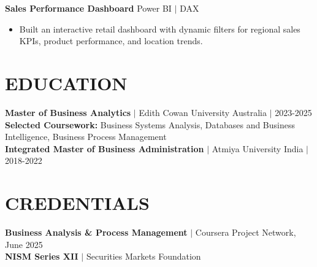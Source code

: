 \documentclass[letterpaper,10pt]{article}
\newcommand{\project}[2]{\textbf{#1} \hfill #2\par\vspace{-1pt}}
\begin{document}
\project{Sales Performance Dashboard}{Power BI $\vert$ DAX}
\begin{itemize}
  \item Built an interactive retail dashboard with dynamic filters for regional sales KPIs, product performance, and location trends.
\end{itemize}

\section*{EDUCATION}
\textbf{Master of Business Analytics} $\vert$ Edith Cowan University \hfill Australia $\vert$ 2023-2025\\
\textbf{Selected Coursework:} Business Systems Analysis, Databases and Business Intelligence, Business Process Management\\
\textbf{Integrated Master of Business Administration} $\vert$ Atmiya University \hfill India $\vert$ 2018-2022

\section*{CREDENTIALS}
\textbf{Business Analysis \& Process Management} $\vert$ Coursera Project Network, June 2025\\
\textbf{NISM Series XII} $\vert$ Securities Markets Foundation
\end{document}
